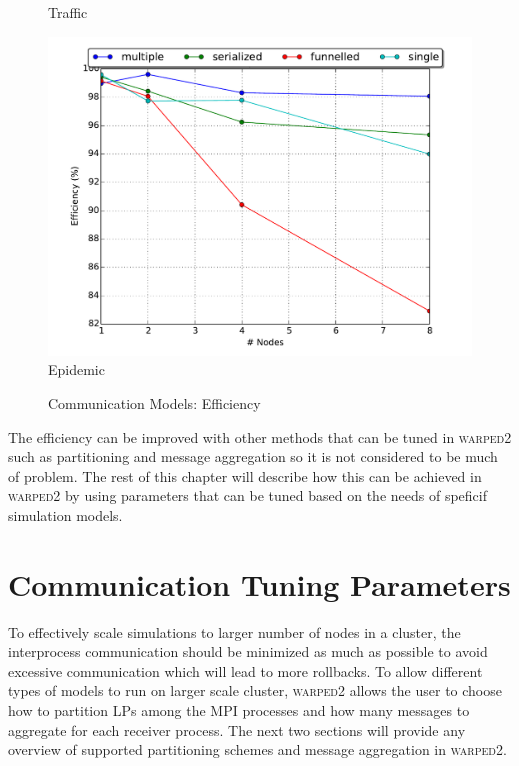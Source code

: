 \documentclass[11pt]{book}
\begin{document}
\begin{figure}
\begin{minipage}{.5\textwidth}
\begin{center}
      Traffic \\
    \end{center}
  \end{minipage}
  \centering
  \begin{minipage}{.5\textwidth}
    \begin{center}
      \includegraphics[width=\textwidth,keepaspectratio,quiet]{figs/partitioning_communication/communication_epidemic_efficiency.pdf} \\
      Epidemic \\
    \end{center}
  \end{minipage}
  \caption{Communication Models: Efficiency}\label{communication_model_efficiency}
\end{figure}

The efficiency can be improved with other methods that can be tuned in \textsc{warped2} such
as partitioning and message aggregation so it is not considered to be much of problem.  The
rest of this chapter will describe how this can be achieved in \textsc{warped2} by using
parameters that can be tuned based on the needs of speficif simulation models.

\section{Communication Tuning Parameters}

To effectively scale simulations to larger number of nodes in a cluster, the interprocess communication
should be minimized as much as possible to avoid excessive communication which will lead to
more rollbacks.  To allow different types of models to run on larger scale cluster, \textsc{warped2}
allows the user to choose how to partition LPs among the MPI processes and how many messages
to aggregate for each receiver process.  The next two sections will provide any overview
of supported partitioning schemes and message aggregation in \textsc{warped2}.
\end{document}

